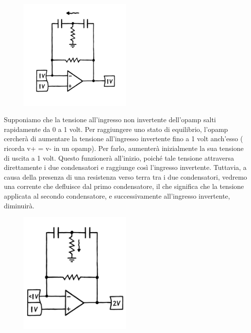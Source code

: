 \documentclass{article}
\theoremstyle{definition}
\begin{document}
\begin{figure}[ht]
    \centering
    \includegraphics[width=0.5\textwidth]{../images/Toscillator1.png} 
    \label{fig:Toscillator1}
\end{figure}

 Supponiamo che la tensione all'ingresso non invertente dell'opamp salti rapidamente da 0 a 1 volt. Per raggiungere uno stato di equilibrio, l'opamp cercherà di aumentare la tensione all'ingresso invertente fino a 1 volt anch'esso ( ricorda v+ = v- in un opamp).
 Per farlo, aumenterà inizialmente la sua tensione di uscita a 1 volt. Questo funzionerà all'inizio, poiché tale tensione attraversa direttamente i due condensatori e raggiunge così l'ingresso invertente.
 Tuttavia, a causa della presenza di una resistenza verso terra tra i due condensatori, vedremo una corrente che defluisce dal primo condensatore, il che significa che la tensione applicata al secondo condensatore, e successivamente all'ingresso invertente, diminuirà.

\begin{figure}[ht]
    \centering
    \includegraphics[width=0.5\textwidth]{../images/Toscillator2.png} 
    \label{fig:Toscillator2}
\end{figure}
\end{document}
